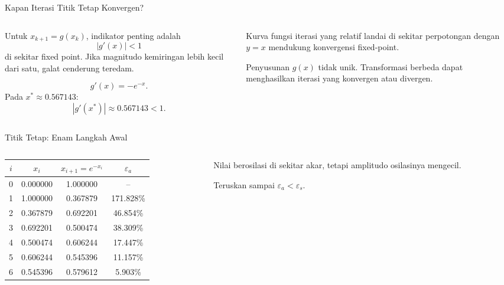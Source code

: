 \documentclass[aspectratio=169,10pt]{beamer}
\begin{document}
\begin{frame}{Kapan Iterasi Titik Tetap Konvergen?}
\scriptsize
\begin{columns}[T,totalwidth=\textwidth]
\begin{column}{.52\textwidth}
\begin{bluebox}
Untuk \(x_{k+1}=g(x_k)\), indikator penting adalah
\[
\left|g'(x)\right|<1
\]
di sekitar fixed point. Jika magnitudo kemiringan lebih kecil dari satu, galat cenderung teredam.
\end{bluebox}
\begin{orangebox}
\[
g'(x)=-e^{-x}.
\]
Pada \(x^*\approx0.567143\):
\[
\left|g'(x^*)\right|\approx0.567143<1.
\]
\end{orangebox}
\end{column}
\begin{column}{.44\textwidth}
\begin{greenbox}
Kurva fungsi iterasi yang relatif landai di sekitar perpotongan dengan \(y=x\) mendukung konvergensi fixed-point.
\end{greenbox}
\begin{goldbox}
Penyusunan \(g(x)\) tidak unik. Transformasi berbeda dapat menghasilkan iterasi yang konvergen atau divergen.
\end{goldbox}
\end{column}
\end{columns}
\end{frame}

\begin{frame}{Titik Tetap: Enam Langkah Awal}
\scriptsize
\renewcommand{\arraystretch}{1.10}
\begin{columns}[T,totalwidth=\textwidth]
\begin{column}{.60\textwidth}
\begin{tabular}{c c c c}
\toprule
$i$ & $x_i$ & $x_{i+1}=e^{-x_i}$ & $\varepsilon_a$\\
\midrule
0 & 0.000000 & 1.000000 & --\\
1 & 1.000000 & 0.367879 & 171.828\%\\
2 & 0.367879 & 0.692201 & 46.854\%\\
3 & 0.692201 & 0.500474 & 38.309\%\\
4 & 0.500474 & 0.606244 & 17.447\%\\
5 & 0.606244 & 0.545396 & 11.157\%\\
6 & 0.545396 & 0.579612 & 5.903\%\\
\bottomrule
\end{tabular}
\end{column}
\begin{column}{.35\textwidth}
\begin{bluebox}[Pola]
Nilai berosilasi di sekitar akar, tetapi amplitudo osilasinya mengecil.
\end{bluebox}
\begin{orangebox}[Target]
Teruskan sampai \(\varepsilon_a<\varepsilon_s\).
\end{orangebox}
\end{column}
\end{columns}
\end{frame}
\end{document}
